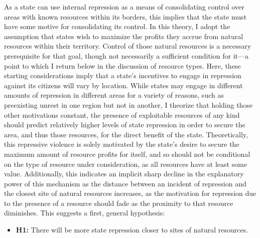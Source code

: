 As a state can use internal repression as a means of consolidating control over areas with known resources within its borders, this implies that the state must have some motive for consolidating its control. In this theory, I adopt the assumption that states wish to maximize the profits they accrue from natural resources within their territory. Control of those natural resources is a necessary prerequisite for that goal, though not necessarily a sufficient condition for it—a point to which I return below in the discussion of resource types. Here, these starting considerations imply that a state’s incentives to engage in repression against its citizens will vary by location. While states may engage in different amounts of repression in different areas for a variety of reasons, such as preexisting unrest in one region but not in another, I theorize that holding those other motivations constant, the presence of exploitable resources of any kind should predict relatively higher levels of state repression in order to secure the area, and thus those resources, for the direct benefit of the state. Theoretically, this repressive violence is solely motivated by the state’s desire to secure the maximum amount of resource profits for itself, and so should not be conditional on the type of resource under consideration, as all resources have at least some value. Additionally, this indicates an implicit sharp decline in the explanatory power of this mechanism as the distance between an incident of repression and the closest site of natural resources increases, as the motivation for repression due to the presence of a resource should fade as the proximity to that resource diminishes. This suggests a first, general hypothesis:

\begin{itemize}
	\item \textbf{H1:} There will be more state repression closer to sites of natural resources.
\end{itemize}

